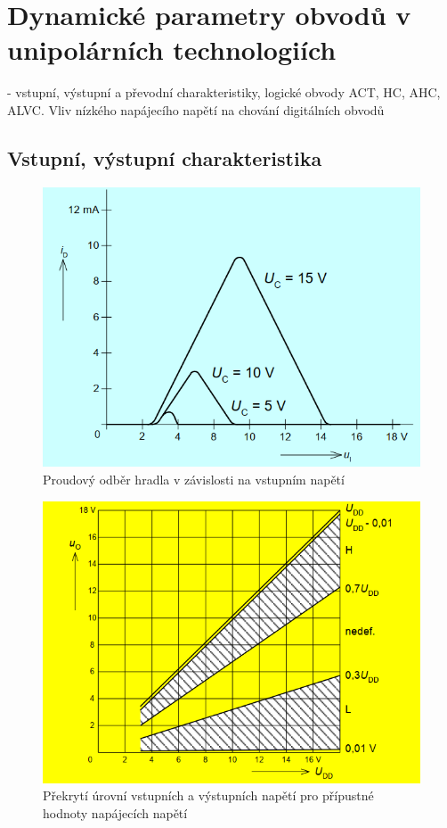 \section{Dynamické parametry obvodů v unipolárních technologiích}
- vstupní, výstupní a převodní charakteristiky, logické obvody ACT, HC, AHC, ALVC. Vliv nízkého napájecího napětí na chování digitálních obvodů
\subsection{Vstupní, výstupní charakteristika}
   \begin{figure}[h]
   \begin{center}
     \includegraphics[scale=0.6]{images/VstupCMOS.png}
   \end{center}
   \caption{Proudový odběr hradla v závislosti na vstupním napětí}
  \end{figure}

   \begin{figure}[h]
   \begin{center}
     \includegraphics[scale=0.6]{images/VystupCMOS.png}
   \end{center}
   \caption{Překrytí úrovní vstupních a výstupních napětí pro přípustné hodnoty
napájecích napětí}
  \end{figure}



